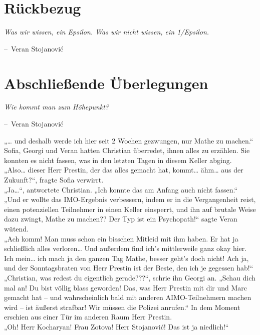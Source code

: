 \documentclass[oneside]{memoir}
\makeatletter
\newenvironment{chapquote}[2][2em]
  {\setlength{\@tempdima}{#1}%
   \def\chapquote@author{#2}%
   \parshape 1 \@tempdima \dimexpr\textwidth-2\@tempdima\relax%
   \itshape}
  {\par\normalfont\hfill--\ \chapquote@author\hspace*{\@tempdima}\par\bigskip}
\makeatother
\begin{document}
\chapter{Rückbezug} %
\begin{chapquote}{Veran Stojanović}
\glqq Was wir wissen, ein Epsilon. Was wir nicht wissen, ein 1/Epsilon.\grqq
\end{chapquote}

\chapter{Abschließende Überlegungen} %
\begin{chapquote}{Veran Stojanović}
\glqq Wie kommt man zum Höhepunkt?\grqq
\end{chapquote}
„\ldots{} und deshalb werde ich hier seit 2 Wochen gezwungen, nur Mathe zu machen.“ \\
Sofia, Georgi und Veran hatten Christian überredet, ihnen alles zu erzählen. Sie konnten es nicht fassen, was in den letzten Tagen in diesem Keller abging. \\
„Also\ldots{} dieser Herr Prestin, der das alles gemacht hat, kommt\ldots{} ähm\ldots{} aus der Zukunft?“, fragte Sofia verwirrt. \\
„Ja\ldots“, antwortete Christian. „Ich konnte das am Anfang auch nicht fassen.“ \\
„Und er wollte das IMO-Ergebnis verbessern, indem er in die Vergangenheit reist, einen potenziellen Teilnehmer in einen Keller einsperrt, und ihn auf brutale Weise dazu zwingt, Mathe zu machen?? Der Typ ist ein Psychopath!“ sagte Veran wütend. \\
„Ach komm! Man muss schon ein bisschen Mitleid mit ihm haben. Er hat ja schließlich alles verloren\ldots{} Und außerdem find ich’s mittlerweile ganz okay hier. Ich mein\ldots{} ich mach ja den ganzen Tag Mathe, besser geht’s doch nicht!
Ach ja, und der Sonntagsbraten von Herr Prestin ist der Beste, den ich je gegessen hab!“ \\
„Christian, was redest du eigentlich gerade???“, schrie ihn Georgi an. „Schau dich mal an! Du bist völlig blass geworden! Das, was Herr Prestin mit dir und Marc gemacht hat -- und wahrscheinlich bald mit anderen AIMO-Teilnehmern machen wird -- ist äußerst strafbar! Wir müssen die Polizei anrufen.“
In dem Moment erschien aus einer Tür im anderen Raum Herr Prestin. \\
„Oh! Herr Kocharyan! Frau Zotova! Herr Stojanović! Das ist ja niedlich!“ \\
\end{document}
